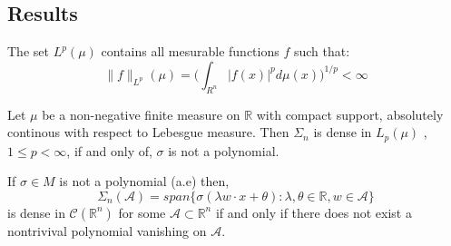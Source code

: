 \documentclass[../main.tex]{subfiles}
\begin{document}
\subsection{Results}


\begin{definition} The set $L^{p}(\mu)$ contains all mesurable functions $f$ such that: 
	$$ \|f\|_{L^p}(\mu) = \Big( \int_{R^n} |f(x)|^p d\mu(x)\Big)^{1/p} < \infty $$
	
\end{definition}

\begin{propo}
	Let $\mu $ be a non-negative finite measure on $\mathbb{R}$ with compact support, absolutely continous with respect to Lebesgue measure. Then $\Sigma_n$ is dense in $L_p(\mu)$ , $1\leq p < \infty$, if and only of, $\sigma$ is not a polynomial.
\end{propo}

\begin{propo}
	If $\sigma\in M$ is not a polynomial (a.e) then, $$ \Sigma_n(\mathcal{A})= span \{ \sigma(\lambda w \cdot x + \theta) : \lambda, \theta \in \mathbb{R}, w \in \mathcal{A} \}$$
	is dense in $\mathcal{C}(\mathbb{R}^n)$ for some $\mathcal{A}\subset \mathbb{R}^n$ if and only if there does not exist a nontrivival polynomial vanishing on $\mathcal{A}$.
\end{propo}


	\cite{leshno1993multilayer}
\end{document}
